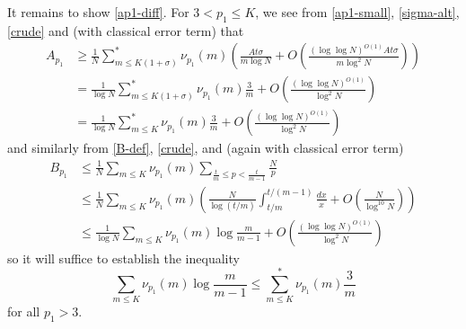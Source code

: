\documentclass[10pt,a4paper,reqno]{amsart}
\numberwithin{equation}{section}
\theoremstyle{plain}
\theoremstyle{definition}
\begin{document}
It remains to show \eqref{ap1-diff}.  For $3 < p_1 \leq K$, we see from \eqref{ap1-small}, \eqref{sigma-alt}, \eqref{crude} and  (with classical error term) that
\begin{align*}
A_{p_1} &\geq \frac{1}{N} \sum_{m \leq K(1+\sigma)}^* \nu_{p_1}(m) \left( \frac{A t \sigma}{m \log N} + O\left( \frac{(\log\log N)^{O(1)}A t \sigma}{m \log^2 N} \right) \right) \\
&= \frac{1}{\log N} \sum_{m \leq K(1+\sigma)}^* \nu_{p_1}(m) \frac{3}{m}+ O\left( \frac{(\log\log N)^{O(1)}}{\log^2 N} \right) \\
&= \frac{1}{\log N} \sum_{m \leq K}^* \nu_{p_1}(m) \frac{3}{m}+ O\left( \frac{(\log\log N)^{O(1)}}{\log^2 N} \right) 
\end{align*}
and similarly from \eqref{B-def}, \eqref{crude}, and  (again with classical error term) 
\begin{align*}
  B_{p_1} &\leq
  \frac{1}{N} \sum_{m \leq K} \nu_{p_1}(m) \sum_{\frac{t}{m} \leq p < \frac{t}{m-1}} \frac{N}{p}  \\
  &\leq \frac{1}{N} \sum_{m \leq K} \nu_{p_1}(m) \left( \frac{N}{\log(t/m)} \int_{t/m}^{t/(m-1)} \frac{dx}{x} + O\left( \frac{N}{\log^{10} N} \right) \right) \\
  &\leq \frac{1}{\log N} \sum_{m \leq K} \nu_{p_1}(m) \log \frac{m}{m-1} + O\left( \frac{(\log\log N)^{O(1)}}{\log^2 N} \right)
\end{align*}
so it will suffice to establish the inequality
\begin{equation}\label{key-ineq} 
   \sum_{m \leq K} \nu_{p_1}(m) \log \frac{m}{m-1} \leq \sum_{m \leq K}^* \nu_{p_1}(m) \frac{3}{m}
\end{equation}
for all $p_1 > 3$.
  
\end{document}
